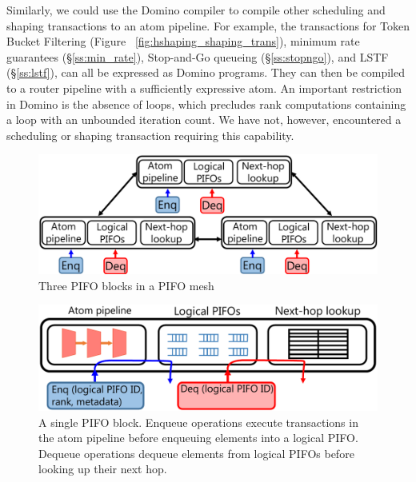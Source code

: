 Similarly, we could use the Domino compiler to compile other scheduling and
shaping transactions to an atom pipeline.  For example, the transactions for
Token Bucket Filtering (Figure ~\ref{fig:hshaping_shaping_trans}), minimum rate
guarantees (\S\ref{ss:min_rate}), Stop-and-Go queueing (\S\ref{ss:stopngo}),
and LSTF (\S\ref{ss:lstf}), can all be expressed as Domino programs. They can
then be compiled to a router pipeline with a sufficiently expressive
atom. An important restriction in Domino is the absence of loops, which
precludes rank computations containing a loop with an unbounded iteration
count. We have not, however, encountered a scheduling or shaping transaction
requiring this capability.

\begin{figure}[!t]
  \centering
  \includegraphics[width=0.6\columnwidth]{pifo_pifo_mesh.pdf}
  \caption{Three PIFO blocks in a PIFO mesh}
  \label{fig:mesh}
\end{figure}

\begin{figure}[!t]
  \centering
  \includegraphics[width=0.6\columnwidth]{pifo_pifo_block.pdf}
  \caption{A single PIFO block. Enqueue operations execute transactions in the atom pipeline
  before enqueuing elements into a logical PIFO. Dequeue operations dequeue elements from logical PIFOs
  before looking up their next hop.} 
  \label{fig:block}
\end{figure}

